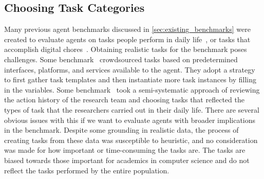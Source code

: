 \documentclass{article}
\begin{document}
\subsection{Choosing Task Categories}
\vspace{-1mm}
Many previous agent benchmarks discussed in \autoref{sec:existing_benchmarks} were created to evaluate agents on tasks people perform in daily life~\citep{zhou2023webarena,lù2024weblinxrealworldwebsitenavigation,deng2023mindweb}, or tasks that accomplish digital chores~\citep{yoran2024assistantbenchwebagentssolve,trivedi2024appworld}.
Obtaining realistic tasks for the benchmark poses challenges. 
Some benchmark~\citep{xie2024osworld,workarena2024,yoran2024assistantbenchwebagentssolve} crowdsourced tasks based on predetermined interfaces, platforms, and services available to the agent.
They adopt a strategy to first gather task templates and then instantiate more task instances by filling in the variables.
Some benchmark~\citep{zhou2023webarena,koh2024visualwebarena,bonatti2024windows} took a semi-systematic approach of reviewing the action history of the research team and choosing tasks that reflected the types of task that the researchers carried out in their daily life.
There are several obvious issues with this if we want to evaluate agents with broader implications in the \tac benchmark.
Despite some grounding in realistic data, the process of creating tasks from these data was susceptible to heuristic, and no consideration was made for how important or time-consuming the tasks are.
The tasks are biased towards those important for academics in computer science and do not reflect the tasks performed by the entire population.
\end{document}
